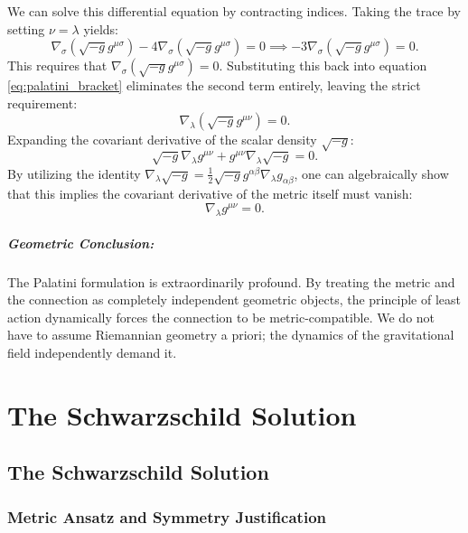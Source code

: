 \documentclass[11pt, a4paper]{report}
\begin{document}
We can solve this differential equation by contracting indices. Taking the trace by setting $\nu = \lambda$ yields:
\begin{equation}
\nabla_{\sigma}(\sqrt{-g}g^{\mu\sigma}) - 4 \nabla_{\sigma}(\sqrt{-g}g^{\mu\sigma}) = 0 \implies -3 \nabla_{\sigma}(\sqrt{-g}g^{\mu\sigma}) = 0.
\end{equation}
This requires that $\nabla_{\sigma}(\sqrt{-g}g^{\mu\sigma}) = 0$. Substituting this back into equation \eqref{eq:palatini_bracket} eliminates the second term entirely, leaving the strict requirement:
\begin{equation}
\nabla_{\lambda}(\sqrt{-g}g^{\mu\nu}) = 0. 
\end{equation}
Expanding the covariant derivative of the scalar density $\sqrt{-g}$:
\begin{equation}
\sqrt{-g} \nabla_{\lambda}g^{\mu\nu} + g^{\mu\nu} \nabla_{\lambda}\sqrt{-g} = 0.
\end{equation}
By utilizing the identity $\nabla_{\lambda}\sqrt{-g} = \frac{1}{2}\sqrt{-g} g^{\alpha\beta}\nabla_{\lambda}g_{\alpha\beta}$, one can algebraically show that this implies the covariant derivative of the metric itself must vanish:
\begin{equation}
\nabla_{\lambda}g^{\mu\nu} = 0.
\end{equation}
\paragraph{Geometric Conclusion:} The Palatini formulation is extraordinarily profound. By treating the metric and the connection as completely independent geometric objects, the principle of least action dynamically forces the connection to be metric-compatible. We do not have to assume Riemannian geometry a priori; the dynamics of the gravitational field independently demand it.


\chapter{The Schwarzschild Solution}
\section{The Schwarzschild Solution}

\subsection{Metric Ansatz and Symmetry Justification}
\end{document}
